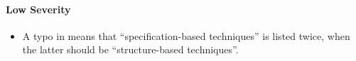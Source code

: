 \ifnotpaper
      \paragraph{Low Severity}
      \begin{itemize}
            \item %
                  A typo in \citep[Fig.~2]{IEEE2021} means that ``specification-based
                  techniques'' is listed twice, when the latter should be
                  ``structure-based techniques''.
      \end{itemize}\fi